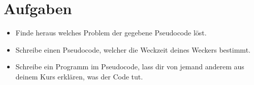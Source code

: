 \section{Aufgaben}

\begin{itemize}
	\item Finde heraus welches Problem der gegebene Pseudocode löst.
	\item Schreibe einen Pseudocode, welcher die Weckzeit deines Weckers bestimmt.
	\item Schreibe ein Programm im Pseudocode, lass dir von jemand anderem aus deinem Kurs erklären, was der Code tut.
\end{itemize}
